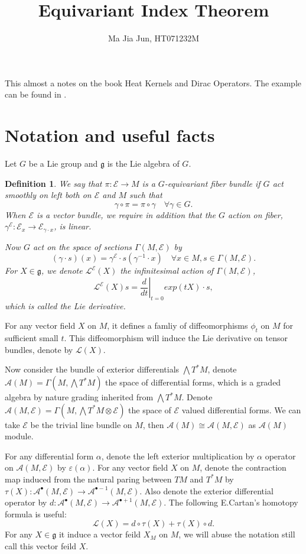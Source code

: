 \documentclass[11pt]{amsart}
\title{Equivariant Index Theorem}
\author{Ma Jia Jun, HT071232M}
\newtheorem{Def}[Thm]{Definition}
\def\cA{{\mathcal{A}}}
\def\cL{{\mathcal{L}}}
\def\cE{{\mathcal{E}}}
\def\fgg{{\mathfrak{g}}}
\begin{document}
\maketitle

This almost a notes on the book Heat Kernels and Dirac Operators\cite{berline2004heat}. The example can be found in \cite{vergne1982representations}.

\section{Notation and useful facts}
Let $G$ be a Lie group and $\fgg$ is the Lie algebra of $G$.
\begin{Def}
We say that $\pi:\cE\to M$ is a  $G$-equivariant fiber bundle if $G$ act smoothly on left both on $\cE$ and $M$ such that 
\[
\gamma \circ \pi = \pi \circ \gamma \quad \forall \gamma\in G.
\]
When $\cE$ is a vector bundle, we require in addition that the $G$
action on fiber, $\gamma^\cE:\cE_x \to \cE_{\gamma\cdot x}$,  is linear.

Now $G$ act on the space of sections $\Gamma(M,\cE)$ by 
\[
(\gamma\cdot s)(x) = \gamma^\cE\cdot s(\gamma^{-1}\cdot x) \quad
\forall x\in M, s\in \Gamma(M,\cE). 
\]
For $X \in \fgg$, we denote $\cL^\cE(X)$ the infinitesimal action of
$\Gamma(M,\cE)$, 
\[
\cL^\cE(X) s =\left.\frac{d}{dt}\right|_{t=0} exp(tX)\cdot s,
\]
which is called the Lie derivative.
\end{Def}
For any vector field $X$ on $M$, it defines a famliy of diffeomorphisms $\phi_t$
on $M$ for sufficient small $t$. This diffeomorphism will induce the
Lie derivative on tensor bundles, denote by $\cL(X)$. 

Now consider the bundle of exterior differentials $\bigwedge
T^*M$, denote $\cA(M)=\Gamma(M,\bigwedge T^*M)$  the space of
differential forms, which is a graded algebra by nature grading
inherited from $\bigwedge T^*M$.
Denote $\cA(M,\cE)=\Gamma(M,\bigwedge T^*M\otimes \cE)$  the space
of $\cE$ valued differential forms. We can take $\cE$ be the trivial
line bundle on $M$, then $\cA(M) \cong \cA(M,\cE)$ as $\cA(M)$ module.  

For any differential form $\alpha$, denote the
left exterior multiplication  by $\alpha$ operator on $\cA(M, \cE)$ by
$\varepsilon(\alpha)$.
For any vector field $X$ on $M$, denote the contraction map induced
from the natural paring between $TM$ and $T^*M$ by 
$\tau(X):\cA^\bullet(M,\cE)\to
\cA^{\bullet-1}(M,\cE)$. Also denote the exterior differential
operator by $d:\cA^\bullet(M,\cE) \to \cA^{\bullet+1}(M,\cE)$. The
  following E.Cartan's homotopy formula is useful:
\[
\cL(X) = d\circ \tau(X) + \tau(X)\circ d.
\]
For any $X\in \fgg$ it induce a vector feild $X_M$ on $M$, we will
abuse the notation still call this vector feild $X$.
\end{document}
